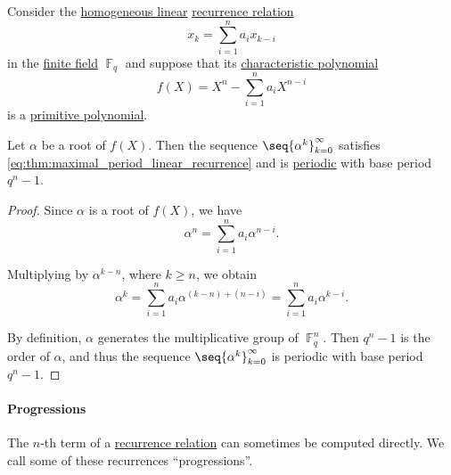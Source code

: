 \begin{proposition}\label{thm:maximal_period_linear_recurrence}
  Consider the \hyperref[def:recurrence_relation/linear]{homogeneous linear} \hyperref[def:recurrence_relation]{recurrence relation}
  \begin{equation}\label{eq:thm:maximal_period_linear_recurrence}
    x_k = \sum_{i=1}^n a_i x_{k-i}
  \end{equation}
  in the \hyperref[def:finite_field]{finite field} \( \BbbF_q \) and suppose that its \hyperref[def:characteristic_polynomial_of_linear_recurrence]{characteristic polynomial}
  \begin{equation*}
    f(X) = X^n - \sum_{i=1}^n a_i X^{n-i}
  \end{equation*}
  is a \hyperref[def:finite_field_primitive_polynomial]{primitive polynomial}.

  Let \( \alpha \) be a root of \( f(X) \). Then the sequence \( \seq{ \alpha^k }_{k=0}^\infty \) satisfies \eqref{eq:thm:maximal_period_linear_recurrence} and is \hyperref[def:periodic_function]{periodic} with base period \( q^n - 1 \).
\end{proposition}
\begin{proof}
  Since \( \alpha \) is a root of \( f(X) \), we have
  \begin{equation*}
    \alpha^n = \sum_{i=1}^n a_i \alpha^{n-i}.
  \end{equation*}

  Multiplying by \( \alpha^{k-n} \), where \( k \geq n \), we obtain
  \begin{equation*}
    \alpha^k
    =
    \sum_{i=1}^n a_i \alpha^{(k-n)+(n-i)}
    =
    \sum_{i=1}^n a_i \alpha^{k-i}.
  \end{equation*}

  By definition, \( \alpha \) generates the multiplicative group of \( \BbbF_q^n \). Then \( q^n - 1 \) is the order of \( \alpha \), and thus the sequence \( \seq{ \alpha^k }_{k=0}^\infty \) is periodic with base period \( q^n - 1 \).
\end{proof}

\paragraph{Progressions}\hfill

The \( n \)-th term of a \hyperref[def:recurrence_relation]{recurrence relation} can sometimes be computed directly. We call some of these recurrences \enquote{progressions}.

